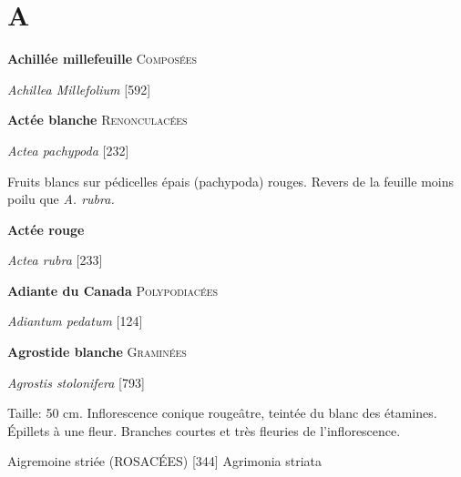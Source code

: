 

\usepackage{lipsum}



\begin{titlingpage}
\maketitle
\end{titlingpage}

\chapter*{A}

\textbf{\large Achillée millefeuille} \hfill {\scshape Composées}
\par\noindent\emph{Achillea Millefolium} \hfill [592]

\lipsum[66]

\vskip1cm

\noindent\textbf{\large Actée blanche} \hfill {\scshape Renonculacées} 
\par\noindent\emph{Actea pachypoda} \hfill [232]			

Fruits blancs sur pédicelles épais (pachypoda) rouges.
Revers de la feuille moins poilu que \emph{A. rubra.}

\vskip1cm

\noindent\textbf{\large Actée rouge}  
\par\noindent\emph{Actea rubra} \hfill [233]

\lipsum[75]

\vskip1cm

\noindent\textbf{\large Adiante du Canada} \hfill {\scshape Polypodiacées}
\par\noindent\emph{Adiantum pedatum} \hfill [124]

\lipsum[66]

\vskip1cm
				
\noindent\textbf{\large Agrostide blanche} \hfill {\small\scshape Graminées}  
\par\noindent\emph{Agrostis stolonifera} \hfill [793]

Taille: 50 cm. Inflorescence conique rougeâtre,
teintée du blanc des étamines. Épillets à une fleur.
Branches courtes et très fleuries de l’inflorescence.


\newpage

Aigremoine striée (ROSACÉES)  [344]
				Agrimonia striata\\

